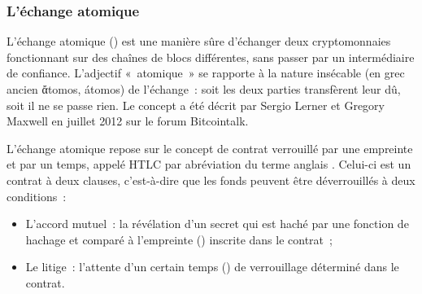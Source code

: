 
\subsubsection*{L'échange atomique} L'échange atomique () est une manière sûre d'échanger deux cryptomonnaies fonctionnant sur des chaînes de blocs différentes, sans passer par un intermédiaire de confiance. L'adjectif «~atomique~» se rapporte à la nature insécable (en grec ancien \foreignlanguage{greek}{ἄtomos}, átomos) de l'échange~: soit les deux parties transfèrent leur dû, soit il ne se passe rien. Le concept a été décrit par Sergio Lerner et Gregory Maxwell en juillet 2012 sur le forum Bitcointalk.

L'échange atomique repose sur le concept de contrat verrouillé par une empreinte et par un temps, appelé HTLC par abréviation du terme anglais . Celui-ci est un contrat à deux clauses, c'est-à-dire que les fonds peuvent être déverrouillés à deux conditions~:

\begin{itemize}
\item L'accord mutuel~: la révélation d'un secret qui est haché par une fonction de hachage et comparé à l'empreinte () inscrite dans le contrat~;
\item Le litige~: l'attente d'un certain temps () de verrouillage déterminé dans le contrat.
\end{itemize}

%

